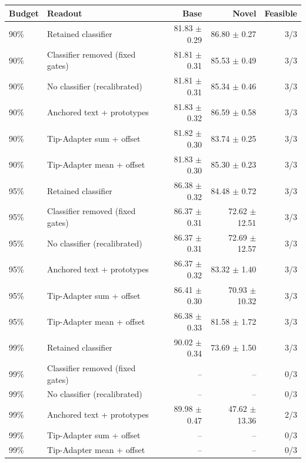 \begin{tabular}{llrrr}
\toprule
Budget & Readout & Base & Novel & Feasible \\
\midrule
90\% & Retained classifier & 81.83 $\pm$ 0.29 & 86.80 $\pm$ 0.27 & 3/3 \\
90\% & Classifier removed (fixed gates) & 81.81 $\pm$ 0.31 & 85.53 $\pm$ 0.49 & 3/3 \\
90\% & No classifier (recalibrated) & 81.81 $\pm$ 0.31 & 85.34 $\pm$ 0.46 & 3/3 \\
90\% & Anchored text + prototypes & 81.83 $\pm$ 0.32 & 86.59 $\pm$ 0.58 & 3/3 \\
90\% & Tip-Adapter sum + offset & 81.82 $\pm$ 0.30 & 83.74 $\pm$ 0.25 & 3/3 \\
90\% & Tip-Adapter mean + offset & 81.83 $\pm$ 0.30 & 85.30 $\pm$ 0.23 & 3/3 \\
\midrule
95\% & Retained classifier & 86.38 $\pm$ 0.32 & 84.48 $\pm$ 0.72 & 3/3 \\
95\% & Classifier removed (fixed gates) & 86.37 $\pm$ 0.31 & 72.62 $\pm$ 12.51 & 3/3 \\
95\% & No classifier (recalibrated) & 86.37 $\pm$ 0.31 & 72.69 $\pm$ 12.57 & 3/3 \\
95\% & Anchored text + prototypes & 86.37 $\pm$ 0.32 & 83.32 $\pm$ 1.40 & 3/3 \\
95\% & Tip-Adapter sum + offset & 86.41 $\pm$ 0.30 & 70.93 $\pm$ 10.32 & 3/3 \\
95\% & Tip-Adapter mean + offset & 86.38 $\pm$ 0.33 & 81.58 $\pm$ 1.72 & 3/3 \\
\midrule
99\% & Retained classifier & 90.02 $\pm$ 0.34 & 73.69 $\pm$ 1.50 & 3/3 \\
99\% & Classifier removed (fixed gates) & -- & -- & 0/3 \\
99\% & No classifier (recalibrated) & -- & -- & 0/3 \\
99\% & Anchored text + prototypes & 89.98 $\pm$ 0.47 & 47.62 $\pm$ 13.36 & 2/3 \\
99\% & Tip-Adapter sum + offset & -- & -- & 0/3 \\
99\% & Tip-Adapter mean + offset & -- & -- & 0/3 \\
\bottomrule
\end{tabular}
